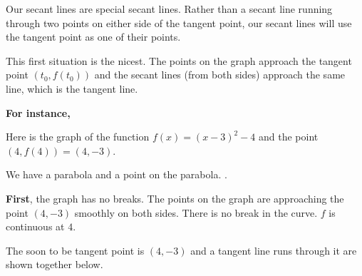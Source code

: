 \documentclass{ximera}
\begin{document}
Our secant lines are special secant lines. Rather than a secant line running through two points on either side of the tangent point, our secant lines will use the tangent point as one of their points. 



This first situation is the nicest. The points on the graph approach the tangent point $(t_0 , f(t_0))$ and the secant lines (from both sides) approach the same line, which is the tangent line.



\textbf{For instance,} 




Here is the graph of the function $f(x) = (x - 3)^2 - 4$ and the point $(4, f(4))= (4, -3)$. \\

\begin{image}
\end{image}

We have a parabola and a point on the parabola. . 


\textbf{First}, the graph has no breaks. The points on the graph are approaching the point $(4, -3)$ smoothly on both sides.  There is no break in the curve. $f$ is continuous at $4$.


The soon to be tangent point is $(4, -3)$ and a tangent line runs through it are shown together below.
\end{document}
